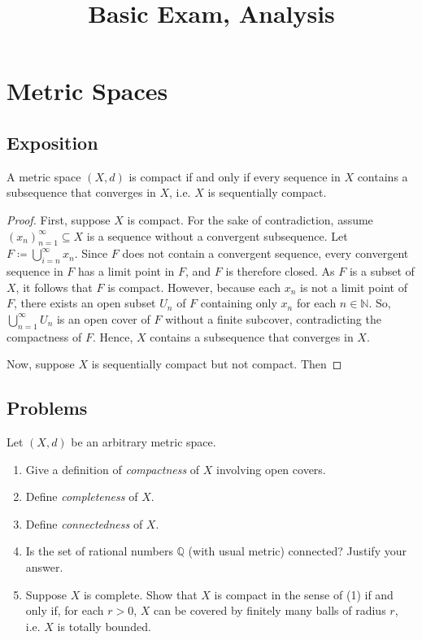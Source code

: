 \documentclass{article}
\title{Basic Exam, Analysis}
\begin{document}
\maketitle

\section{Metric Spaces}

\subsection{Exposition}\label{sub:exposition_ms}

\begin{theorem}
	A metric space \((X,d)\) is compact if and only if every sequence
	in \(X\) contains a subsequence that converges in \(X\), i.e. \(X\)
	is sequentially compact.
\end{theorem}
\begin{proof}
	First, suppose \(X\) is compact.  For the sake of contradiction,
	assume \((x_n)_{n=1}^{\infty}\subseteq X\) is a sequence without a
	convergent subsequence.  Let \(F \coloneqq \bigcup_{i=n}^{\infty}
	x_n\).  Since \(F\) does not contain a convergent sequence, every
	convergent sequence in \(F\) has a limit point in \(F\), and \(F\)
	is therefore closed.  As \(F\) is a subset of \(X\), it follows
	that \(F\) is compact.  However, because each \(x_n\) is not a
	limit point of \(F\), there exists an open subset \(U_n\) of \(F\)
	containing only \(x_n\) for each \(n\in \mathbb{N}\).  So,
	\(\bigcup_{n=1}^{\infty} U_n\) is an open cover of \(F\) without a
	finite subcover, contradicting the compactness of \(F\).  Hence,
	\(X\) contains a subsequence that converges in \(X\).

	Now, suppose \(X\) is sequentially compact but not compact.  Then
\end{proof}

\subsection{Problems}\label{sub:problems_ms}

\begin{problem}
Let \((X,d)\) be an arbitrary metric space.
\begin{enumerate}
	\item Give a definition of \textit{compactness} of \(X\) involving open covers.
	\item Define \textit{completeness} of \(X\).
	\item Define \textit{connectedness} of \(X\).
	\item Is the set of rational numbers \(\mathbb{Q}\) (with usual metric) connected?  Justify your answer.
	\item Suppose \(X\) is complete.  Show that \(X\) is compact in the sense of (1) if and only if, for each \(r > 0\), \(X\) can be covered by finitely many balls of radius \(r\), i.e. \(X\) is totally bounded.
\end{enumerate}
\end{problem}
\end{document}
